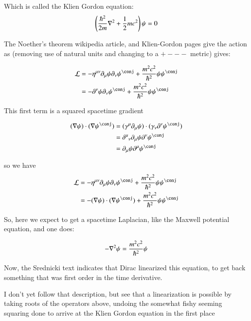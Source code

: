 \documentclass{article}
\begin{document}
Which is called the Klien Gordon equation:
\begin{align*}
\left(\frac{\hbar^2}{2m} \nabla^2 + \frac{1}{2} m c^2\right) \psi = 0 \\
\end{align*}

The Noether's theorem wikipedia article, and Klien-Gordon pages give the action
as (removing use of natural units and changing to a $+---$ metric) gives:

\begin{align*}
\LL &= -\eta^{\mu\nu} \partial_\mu \psi \partial_\nu \psi^\conj + \frac{m^2 c^2}{\hbar^2} \psi \psi^\conj \\
&= -\partial^\nu \psi \partial_\nu \psi^\conj + \frac{m^2 c^2}{\hbar^2} \psi \psi^\conj \\
\end{align*}

This first term is a squared spacetime gradient

\begin{align*}
(\grad \psi) \cdot (\grad \psi^\conj) 
&= (\gamma^\mu \partial_\mu \psi) \cdot (\gamma_\nu \partial^\nu \psi^\conj) \\
&= {\delta^\mu}_\nu \partial_\mu \psi \partial^\nu \psi^\conj \\
&= \partial_\mu \psi \partial^\mu \psi^\conj \\
\end{align*}

so we have
\begin{align*}
\LL 
&= -\eta^{\mu\nu} \partial_\mu \psi \partial_\nu \psi^\conj + \frac{m^2 c^2}{\hbar^2} \psi \psi^\conj \\
&= -(\grad \psi) \cdot (\grad \psi^\conj) + \frac{m^2 c^2}{\hbar^2} \psi \psi^\conj \\
\end{align*}

So, here we expect to get a spacetime Laplacian, like the Maxwell potential equation, and one does:

\begin{align*}
-\nabla^2 \psi = \frac{m^2 c^2}{\hbar^2} \psi
\end{align*}

Now, the Srednicki text indicates that Dirac linearized this equation, to get back something that was
first order in the time derivative.

I don't yet follow that description, but see that a linearization is possible by taking roots of the operators above,
undoing the somewhat fishy seeming squaring done to arrive at the Klien Gordon equation in the first place
\end{document}
